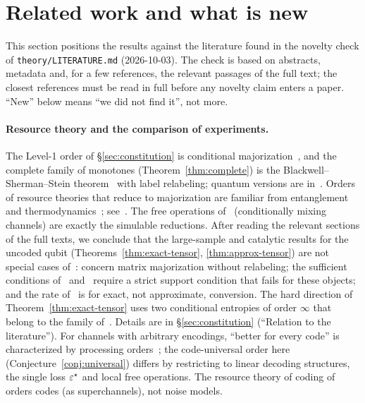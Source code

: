 \section{Related work and what is new}\label{sec:related}

This section positions the results against the literature found in the novelty check of \texttt{theory/LITERATURE.md} (2026-10-03). The check is based on abstracts, metadata and, for a few references, the relevant passages of the full text; the closest references must be read in full before any novelty claim enters a paper. ``New'' below means ``we did not find it'', not more.

\paragraph{Resource theory and the comparison of experiments.}
The Level-1 order of \S\ref{sec:constitution} is conditional majorization~\cite{GGHKLN}, and the complete family of monotones (Theorem~\ref{thm:complete}) is the Blackwell--Sherman--Stein theorem~\cite{Blackwell,Torgersen} with label relabeling; quantum versions are in~\cite{Buscemi12,Matsumoto,Chefles,Jencova}. Orders of resource theories that reduce to majorization are familiar from entanglement~\cite{Nielsen} and thermodynamics~\cite{GMNSH}; see~\cite{ChitambarGour}. The free operations of~\cite{RHT} (conditionally mixing channels) are exactly the simulable reductions. After reading the relevant sections of the full texts, we conclude that the large-sample and catalytic results for the uncoded qubit (Theorems~\ref{thm:exact-tensor}, \ref{thm:approx-tensor}) are not special cases of~\cite{MPST,FFHT,RHT}: \cite{MPST,FFHT} concern matrix majorization without relabeling; the sufficient conditions of~\cite[Thm.~6.3]{RHT} and~\cite[Thm.~8.3]{RHT} require a strict support condition that fails for these objects; and the rate of~\cite[Thm.~8.1]{RHT} is for exact, not approximate, conversion. The hard direction of Theorem~\ref{thm:exact-tensor} uses two conditional entropies of order $\infty$ that belong to the family of~\cite{RHT}. Details are in \S\ref{sec:constitution} (``Relation to the literature''). For channels with arbitrary encodings, ``better for every code'' is characterized by processing orders~\cite{Shannon58,Buscemi16,Buscemi18}; the code-universal order here (Conjecture~\ref{conj:universal}) differs by restricting to linear decoding structures, the single loss $\varepsilon^{\star}$ and local free operations. The resource theory of coding of~\cite{WLWL} orders codes (as superchannels), not noise models.

